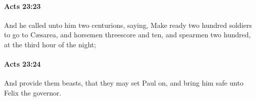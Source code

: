 		\paragraph{Acts 23:23} %
			\label{ACTS-23-23}

			And he called unto him two centurions, saying, Make ready two hundred soldiers to go to Cæsarea, and horsemen threescore and ten, and spearmen two hundred, at the third hour of the night;

			\begin{framed}
			\scriptsize
				\begin{compactdesc}
					\item[SBLG] 
				\end{compactdesc}
			\end{framed}

		\paragraph{Acts 23:24} %
			\label{ACTS-23-24}

			And provide them beasts, that they may set Paul on, and bring him safe unto Felix the governor.

